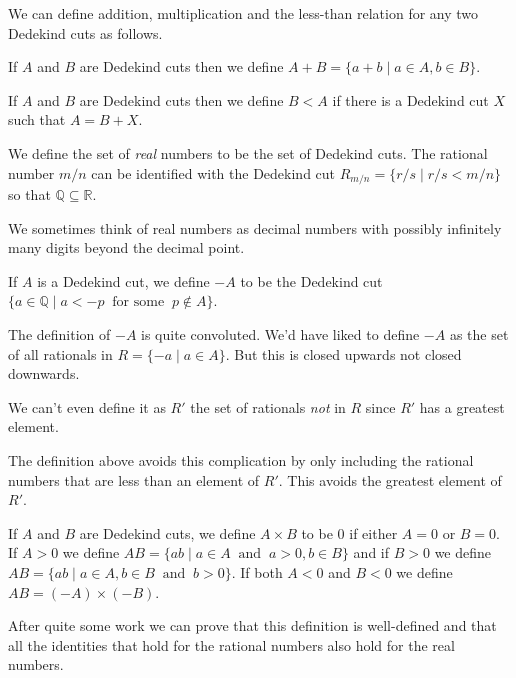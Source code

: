 \documentclass[10pt]{article}
\newcommand{\Q}{\mathbb{Q}}
\newcommand{\R}{\mathbb{R}}
\newenvironment{definition}[1][Definition]{\begin{trivlist}
\item[\hskip \labelsep {\bfseries #1}]}{\end{trivlist}}
\begin{document}
We can define addition, multiplication and the less-than relation for any two Dedekind cuts as follows.

\begin{definition}
If $A$ and $B$ are Dedekind cuts then we define $A + B = \{a + b \;|\; a \in A, b \in B\}$.
\end{definition}

\begin{definition}
If $A$ and $B$ are Dedekind cuts then we define $B < A$ if there is a Dedekind cut $X$ such that $A = B + X$.
\end{definition}

\begin{definition}
We define the set of \emph{real} numbers to be the set of Dedekind cuts. The rational number $m/n$ can be identified with the Dedekind cut $R_{m/n} = \{r/s \;|\; r/s < m/n\}$ so that $\Q \subseteq \R$.
\end{definition}

We sometimes think of real numbers as decimal numbers with possibly infinitely many digits beyond the decimal point.

\begin{definition}
If $A$ is a Dedekind cut, we define $-A$ to be the Dedekind cut $\{a \in \Q \;|\; a < -p \;\;\mbox{for some}\;\; p \notin A\}$.
\end{definition}

The definition of $-A$ is quite convoluted. We'd have liked to define $-A$ as the set of all rationals in $R = \{-a \;|\; a \in A\}$. But this is closed upwards not closed downwards.

We can't even define it as $R'$ the set of rationals \emph{not} in $R$ since $R'$ has a greatest element.

The definition above avoids this complication by only including the rational numbers that are less than an element of $R'$. This avoids the greatest element of $R'$.

\begin{definition}
If $A$ and $B$ are Dedekind cuts, we define $A\times B$ to be $0$ if either $A = 0$ or $B = 0$. If $A > 0$ we define $AB = \{ab \;|\; a \in A \;\;\mbox{and}\;\; a > 0, b \in B\}$ and if $B > 0$ we define $AB = \{ab \;|\; a \in A, b \in B \;\;\mbox{and}\;\; b > 0\}$. If both $A < 0$ and $B < 0$ we define $AB = (-A)\times (-B)$.
\end{definition}

After quite some work we can prove that this definition is well-defined and that all the identities that hold for the rational numbers also hold for the real numbers.
\end{document}
